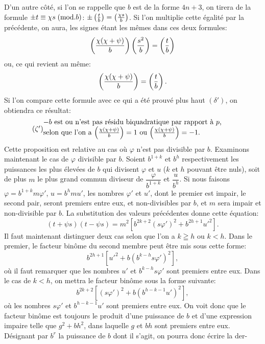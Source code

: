 \noindent
D'un autre côté, si l'on se rappelle que $b$ est de la forme $4n+3$, on tirera
de la formule $\pm t\equiv\chi s\;(\mathrm{mod}.b)$: $\pm\left(\frac{t}{b}\right)=\left(\frac{\chi s}{b}\right)$. Si l'on multiplie cette égalité
par la précédente, on aura, les signes étant les mêmes dans ces deux
formules:
\[
\left(\frac{\chi(\chi+\psi)}{b}\right)\left(\frac{s^2}{b}\right)=\left(\frac{t}{b}\right)
\]
ou, ce qui revient au même:
\[
\left(\frac{\chi(\chi+\psi)}{b}\right)=\left(\frac{t}{b}\right).
\]
Si l'on compare cette formule avec ce qui a été prouvé plus haut $(\delta')$, on obtiendra
ce résultat:
\begin{equation*}\tag{$\zeta'$}
\begin{minipage}{0.83\textwidth}
$-b$ est ou n'est pas résidu biquadratique par rapport à $p$,\par
selon que l'on a $\leg{\chi(\chi+\psi)}{b}=1$ ou $\leg{\chi(\chi+\psi)}{b}=-1$.
\end{minipage}
\end{equation*}
Cette proposition est relative au cas où $\varphi$ n'est pas divisible par $b$. Examinons
maintenant le cas de $\varphi$ divisible par $b$. Soient $b^{1+k}$ et $b^h$ respectivement
les puissances les plus élevées de $b$ qui divisent $\varphi$ et $u$ ($k$ et $h$ pouvant être
nuls), soit de plus $m$ le plus grand commun diviseur de $\dfrac{\varphi}{b^{1+k}}$ et $\dfrac{u}{b^h}$. Si nous
faisons $\varphi=b^{1+k}m\varphi'$, $u=b^hmu'$, les nombres $\varphi'$ et $u'$, dont le premier est
impair, le second pair, seront premiers entre eux, et non-divisibles par $b$, et $m$
sera impair et non-divisible par $b$. La substitution des valeurs précédentes
donne cette équation:
\[
(t+\psi s)(t-\psi s)=m^2[b^{2k+2}(s\varphi')^2+b^{2h+1}u'^2].
\]
Il faut maintenant distinguer deux cas selon que l'on a $k\geqq h$ ou $k<h$.
Dans le premier, le facteur binôme du second membre peut être mis sous cette
forme:
\[
b^{2h+1}[u'^2+b(b^{k-h}s\varphi')^2],
\]
où il faut remarquer que les nombres $u'$ et $b^{k-h}s\varphi'$ sont premiers entre eux.
Dans le cas de $k<h$, on mettra le facteur binôme sous la forme suivante:
\[
b^{2k+2}[(s\varphi')^2+b(b^{h-k-1}u')^2],
\]
où les nombres $s\varphi'$ et $b^{h-k-1}u'$ sont premiers entre eux. On voit donc que le
facteur binôme est toujours le produit d'une puissance de $b$ et d'une expression
impaire telle que $g^2+bh^2$, dans laquelle $g$ et $bh$ sont premiers entre eux. Désignant
par $b^r$ la puissance de $b$ dont il s'agit, on pourra donc écrire la \mbox{der-}
